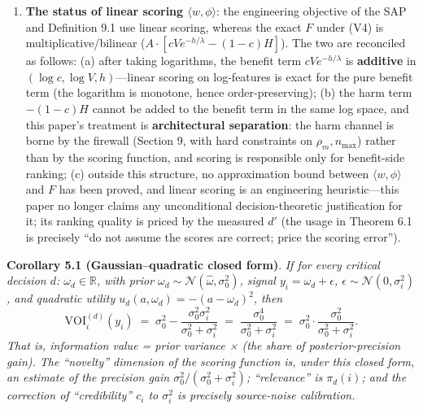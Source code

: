 \documentclass[
  11pt]{article}
\begin{document}
\begin{enumerate}
  a breaking decision (\(\lambda_1\) small) and \(d_2\) a persistent
  decision (\(\lambda_2\) large). Item \(i\) is relevant only to
  \(d_1\), item \(j\) only to \(d_2\), and the two have identical
  five-dimensional scalar features (the same aggregate relevance,
  novelty, durability reading, actionability, and credibility). Then
  \(v_i^* \propto e^{-h/\lambda_1}\) while
  \(v_j^* \propto e^{-h/\lambda_2}\), and when
  \(\lambda_1 \ne \lambda_2\), \(v_i^* \ne v_j^*\): identical
  five-dimensional features correspond to different values. Hence
  \(\sum_d \pi_d(i)\,[\,\cdot\,]_d\) is in general not a function of
  aggregate scalars---an ``exact summary'' must be premised on (V4) and
  cannot be quietly assumed.
\item
  \textbf{The status of linear scoring \(\langle w, \phi\rangle\)}: the
  engineering objective of the SAP and Definition 9.1 use linear
  scoring, whereas the exact \(F\) under (V4) is multiplicative/bilinear
  (\(A \cdot [cVe^{-h/\lambda} - (1-c)H]\)). The two are reconciled as
  follows: (a) after taking logarithms, the benefit term
  \(cVe^{-h/\lambda}\) is \textbf{additive} in
  \((\log c, \log V, h)\)---linear scoring on log-features is exact for
  the pure benefit term (the logarithm is monotone, hence
  order-preserving); (b) the harm term \(-(1-c)H\) cannot be added to
  the benefit term in the same log space, and this paper's treatment is
  \textbf{architectural separation}: the harm channel is borne by the
  firewall (Section 9, with hard constraints on \(\rho_m, n_{\max}\))
  rather than by the scoring function, and scoring is responsible only
  for benefit-side ranking; (c) outside this structure, no approximation
  bound between \(\langle w, \phi\rangle\) and \(F\) has been proved,
  and linear scoring is an engineering heuristic---this paper no longer
  claims any unconditional decision-theoretic justification for it; its
  ranking quality is priced by the measured \(d'\) (the usage in Theorem
  6.1 is precisely ``do not assume the scores are correct; price the
  scoring error'').
\end{enumerate}

\textbf{Corollary 5.1 (Gaussian--quadratic closed form)}. \emph{If for
every critical decision \(d\): \(\omega_d \in \mathbb{R}\), with prior
\(\omega_d \sim \mathcal{N}(\hat\omega, \sigma_0^2)\), signal
\(y_i = \omega_d + \epsilon\),
\(\epsilon \sim \mathcal{N}(0, \sigma_i^2)\), and quadratic utility
\(u_d(a,\omega_d) = -(a - \omega_d)^2\), then}
\[\mathrm{VOI}_i^{(d)}(y_i) \;=\; \sigma_0^2 - \frac{\sigma_0^2 \sigma_i^2}{\sigma_0^2 + \sigma_i^2} \;=\; \frac{\sigma_0^4}{\sigma_0^2 + \sigma_i^2} \;=\; \sigma_0^2 \cdot \frac{\sigma_0^2}{\sigma_0^2 + \sigma_i^2}.\]
\emph{That is, information value = prior variance × (the share of
posterior-precision gain). The ``novelty'' dimension of the scoring
function is, under this closed form, an estimate of the precision gain
\(\sigma_0^2/(\sigma_0^2+\sigma_i^2)\); ``relevance'' is \(\pi_d(i)\);
and the correction of ``credibility'' \(c_i\) to \(\sigma_i^2\) is
precisely source-noise calibration.}
\end{document}
